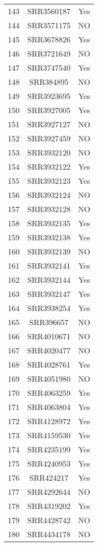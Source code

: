 \begin{longtable}{ccc}
  143 & SRR3560187 & Yes \\ 
  144 & SRR3571175 & NO \\ 
  145 & SRR3678826 & Yes \\ 
  146 & SRR3721649 & NO \\ 
  147 & SRR3747540 & Yes \\ 
  148 & SRR384895 & NO \\ 
  149 & SRR3923695 & Yes \\ 
  150 & SRR3927005 & Yes \\ 
  151 & SRR3927127 & NO \\ 
  152 & SRR3927459 & NO \\ 
  153 & SRR3932120 & NO \\ 
  154 & SRR3932122 & Yes \\ 
  155 & SRR3932123 & Yes \\ 
  156 & SRR3932124 & NO \\ 
  157 & SRR3932128 & NO \\ 
  158 & SRR3932135 & Yes \\ 
  159 & SRR3932138 & Yes \\ 
  160 & SRR3932139 & NO \\ 
  161 & SRR3932141 & Yes \\ 
  162 & SRR3932144 & Yes \\ 
  163 & SRR3932147 & Yes \\ 
  164 & SRR3938254 & Yes \\ 
  165 & SRR396657 & NO \\ 
  166 & SRR4010671 & NO \\ 
  167 & SRR4020477 & NO \\ 
  168 & SRR4028761 & Yes \\ 
  169 & SRR4051980 & NO \\ 
  170 & SRR4063259 & Yes \\ 
  171 & SRR4063804 & Yes \\ 
  172 & SRR4128972 & Yes \\ 
  173 & SRR4159530 & Yes \\ 
  174 & SRR4235199 & Yes \\ 
  175 & SRR4240953 & Yes \\ 
  176 & SRR424217 & Yes \\ 
  177 & SRR4292644 & NO \\ 
  178 & SRR4319202 & Yes \\ 
  179 & SRR4428742 & NO \\ 
  180 & SRR4434178 & NO \\ 

\end{longtable}
